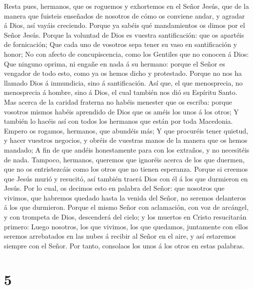  Resta pues, hermanos, que os roguemos y exhortemos en el
Señor Jesús, que de la manera que fuisteis enseñados de nosotros de cómo
os conviene andar, y agradar á Dios, así vayáis creciendo.
 Porque ya sabéis qué mandamientos os dimos por el Señor
Jesús.  Porque la voluntad de Dios es vuestra
santificación: que os apartéis de fornicación;  Que cada
uno de vosotros sepa tener su vaso en santificación y honor;
 No con afecto de concupiscencia, como los Gentiles que no
conocen á Dios:  Que ninguno oprima, ni engañe en nada á
su hermano: porque el Señor es vengador de todo esto, como ya os hemos
dicho y protestado.  Porque no nos ha llamado Dios á
inmundicia, sino á santificación.  Así que, el que
menosprecia, no menosprecia á hombre, sino á Dios, el cual también nos
dió su Espíritu Santo.  Mas acerca de la caridad fraterna
no habéis menester que os escriba: porque vosotros mismos habéis
aprendido de Dios que os améis los unos á los otros;  Y
también lo hacéis así con todos los hermanos que están por toda
Macedonia. Empero os rogamos, hermanos, que abundéis más;
 Y que procuréis tener quietud, y hacer vuestros
negocios, y obréis de vuestras manos de la manera que os hemos mandado;
 A fin de que andéis honestamente para con los extraños,
y no necesitéis de nada.  Tampoco, hermanos, queremos que
ignoréis acerca de los que duermen, que no os entristezcáis como los
otros que no tienen esperanza.  Porque si creemos que
Jesús murió y resucitó, así también traerá Dios con él á los que
durmieron en Jesús.  Por lo cual, os decimos esto en
palabra del Señor: que nosotros que vivimos, que habremos quedado hasta
la venida del Señor, no seremos delanteros á los que durmieron.
 Porque el mismo Señor con aclamación, con voz de
arcángel, y con trompeta de Dios, descenderá del cielo; y los muertos en
Cristo resucitarán primero:  Luego nosotros, los que
vivimos, los que quedamos, juntamente con ellos seremos arrebatados en
las nubes á recibir al Señor en el aire, y así estaremos siempre con el
Señor.  Por tanto, consolaos los unos á los otros en
estas palabras.

\hypertarget{section-4}{%
\section{5}\label{section-4}}

